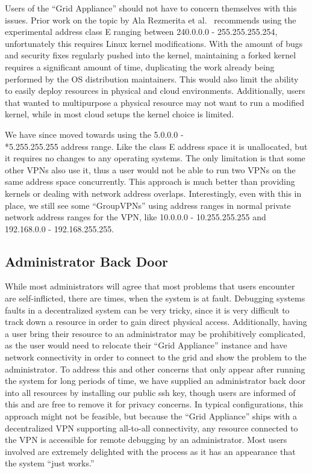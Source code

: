 \documentclass[twocolumn]{svjour3}
\begin{document}
Users of the ``Grid Appliance'' should not have to concern themselves with this
issues.  Prior work on the topic by Ala Rezmerita et al.~\cite{pvc} recommends
using the experimental address class E ranging between 240.0.0.0 -
255.255.255.254, unfortunately this requires Linux kernel modifications.  With
the amount of bugs and security fixes regularly pushed into the kernel,
maintaining a forked kernel requires a significant amount of time, duplicating
the work already being performed by the OS distribution maintainers.  This
would also limit the ability to easily deploy resources in physical and cloud
environments.  Additionally, users that wanted to multipurpose a physical
resource may not want to run a modified kernel, while in most cloud setups the
kernel choice is limited.

We have since moved towards using the 5.0.0.0 - \\*5.255.255.255 address range.
Like the class E address space it is unallocated, but it requires no changes to
any operating systems.  The only limitation is that some other VPNs also use
it, thus a user would not be able to run two VPNs on the same address space
concurrently.  This approach is much better than providing kernels or dealing
with network address overlaps.  Interestingly, even with this in place, we
still see some ``GroupVPNs''  using address ranges in normal private network
address ranges for the VPN, like 10.0.0.0 - 10.255.255.255 and 192.168.0.0 -
192.168.255.255.

\subsection{Administrator Back Door}

While most administrators will agree that most problems that users encounter
are self-inflicted, there are times, when the system is at fault.  Debugging
systems faults in a decentralized system can be very tricky, since it is very
difficult to track down a resource in order to gain direct physical access.
Additionally, having a user bring their resource to an administrator may be
prohibitively complicated, as the user would need to relocate their ``Grid
Appliance'' instance and have network connectivity in order to connect to the
grid and show the problem to the administrator.  To address this and other
concerns that only appear after running the system for long periods of time, we
have supplied an administrator back door into all resources by installing our
public ssh key, though users are informed of this and are free to remove it for
privacy concerns.  In typical configurations, this approach might not be
feasible, but because the ``Grid Appliance'' ships with a decentralized VPN
supporting all-to-all connectivity, any resource connected to the VPN is
accessible for remote debugging by an administrator.  Most users involved are
extremely delighted with the process as it has an appearance that the system
``just works.''
\end{document}
